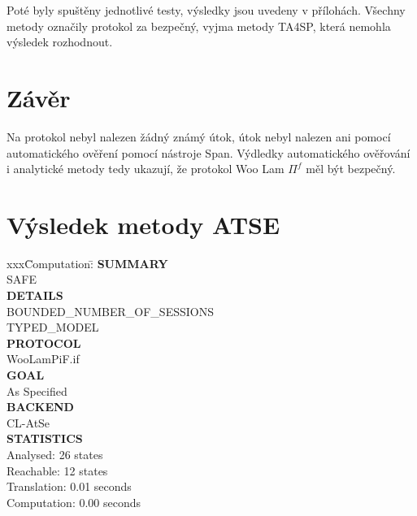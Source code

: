 \documentclass[11pt,a4paper]{article}
\begin{document}
Poté byly spuštěny jednotlivé testy, výsledky jsou uvedeny v přílohách. Všechny metody
označily protokol za bezpečný, vyjma metody TA4SP, která nemohla výsledek rozhodnout.

\section{Závěr}
Na protokol nebyl nalezen žádný známý útok, útok nebyl nalezen ani pomocí automatického ověření pomocí
nástroje Span. Výdledky automatického ověřování i analytické metody tedy
ukazují, že protokol Woo Lam $\Pi^f$ měl být bezpečný.


\renewcommand{\refname}{Použité zdroje}


\appendix

\section{Výsledek metody ATSE}
\begin{tabbing}
xxx\=Computation:\=\kill
\textbf{SUMMARY}\\
\>  SAFE\\
\textbf{DETAILS}\\
\>  BOUNDED\_NUMBER\_OF\_SESSIONS\\
\>  TYPED\_MODEL\\
\textbf{PROTOCOL}\\
\>  WooLamPiF.if\\
\textbf{GOAL}\\
\>  As Specified\\
\textbf{BACKEND}\\
\>  CL-AtSe\\
\textbf{STATISTICS}\\
\>  Analysed\>: 26 states\\
\>  Reachable\>: 12 states\\
\>  Translation\>: 0.01 seconds\\
\>  Computation\>: 0.00 seconds
\end{tabbing}
\end{document}

